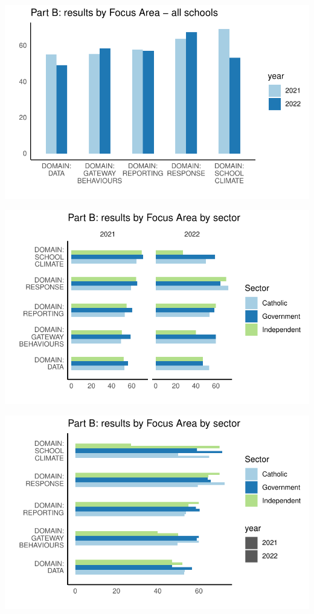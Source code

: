 \documentclass[
  letterpaper,
  DIV=11,
  numbers=noendperiod]{scrartcl}
\begin{document}
\includegraphics{report_files/figure-pdf/unnamed-chunk-15-2.pdf}

\includegraphics{report_files/figure-pdf/unnamed-chunk-16-1.pdf}

\includegraphics{report_files/figure-pdf/unnamed-chunk-16-2.pdf}
\end{document}
